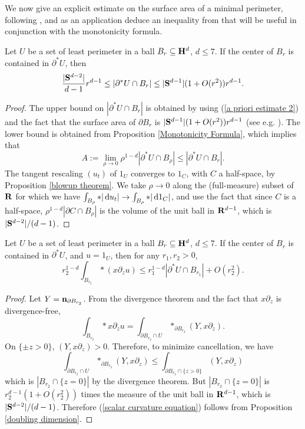 We now give an explicit estimate on the surface area of a minimal perimeter, following \cite[pg74]{Giusti77}, and as an application deduce an inequality from \cite[pg90]{Giusti77} that will be useful in conjunction with the monotonicity formula.

\begin{proposition}\label{doubling dimension}
Let $U$ be a set of least perimeter in a ball $B_r \subseteq \mathbf H^d$, $d \leq 7$.
If the center of $B_r$ is contained in $\partial^* U$, then 
$$\frac{|\mathbf S^{d - 2}|}{d - 1} r^{d - 1} \leq |\partial^*U \cap B_r| \leq |\mathbf S^{d - 1}|(1 + O(r^2))r^{d - 1}.$$
\end{proposition}
\begin{proof}
The upper bound on $|\partial^* U \cap B_r|$ is obtained by using (\ref{a priori estimate 2}) and the fact that the surface area of $\partial B_r$ is $|\mathbf S^{d - 1}|(1 + O(r^2))r^{d - 1}$ (see e.g. \cite{gray1974volume}).
The lower bound is obtained from Proposition \ref{Monotonicity Formula}, which implies that 
$$A := \lim_{\rho \to 0} \rho^{1 - d} |\partial^* U \cap B_\rho| \leq |\partial^* U \cap B_r|.$$
The tangent rescaling $(u_t)$ of $1_U$ converges to $1_C$, with $C$ a half-space, by Proposition \ref{blowup theorem}.
We take $\rho \to 0$ along the (full-measure) subset of $\mathbf{R}$ for which we have $\int_{B_\rho} *|\mathop{}\!\mathrm{d} u_t| \to \int_{B_\rho} *|\mathop{}\!\mathrm{d} 1_C|$,
and use the fact that since $C$ is a half-space, $\rho^{1-d} |\partial C \cap B_\rho|$ is the volume of the unit ball in $\mathbf{R}^{d - 1}$, which is $|\mathbf S^{d - 2}|/(d - 1)$.
\end{proof}

\begin{corollary}\label{scalar curvature monotonicity}
Let $U$ be a set of least perimeter in a ball $B_r \subseteq \mathbf H^d$, $d \leq 7$.
If the center of $B_r$ is contained in $\partial^* U$, and $u = 1_U$, then for any $r_1, r_2 > 0$,
\begin{equation}\label{scalar curvature equation}
r_2^{1 - d}\int_{B_{r_2}} *(x\partial_z u) \leq r_1^{1 - d}|\partial^*U \cap B_{r_1}| + O(r_2^2).
\end{equation}
\end{corollary}
\begin{proof}
Let $Y = \mathbf n_{\partial B_{r_2}}$.
From the divergence theorem and the fact that $x\partial_z$ is divergence-free,
$$\int_{B_{r_2}} *x \partial_z u = \int_{\partial B_{r_2} \cap U} *_{\partial B_{r_2}} (Y, x\partial_z).$$
On $\{\pm z > 0\}$, $(Y, x\partial_z) > 0$. Therefore, to minimize cancellation, we have
$$\int_{\partial B_{r_2} \cap U} *_{\partial B_{r_2}} (Y, x\partial_z) \leq \int_{\partial B_{r_2} \cap \{z > 0\}} (Y, x\partial_z)$$
which is $|B_{r_2} \cap \{z = 0\}|$ by the divergence theorem. But $|B_{r_2} \cap \{z = 0\}|$ is $r_2^{d - 1}(1 + O(r_2^2))$ times the measure of the unit ball in $\mathbf{R}^{d - 1}$, which is $|\mathbf S^{d - 2}|/(d - 1)$.
Therefore (\ref{scalar curvature equation}) follows from Proposition \ref{doubling dimension}.
\end{proof}